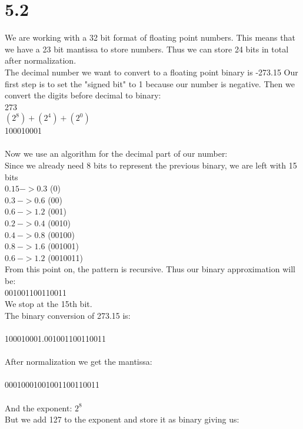 \documentclass{article}
\begin{document}
    \section{5.2}

    We are working with a 32 bit format of floating point numbers. This means that we have a 23 bit mantissa to store numbers.
    Thus we can store 24 bits in total after normalization.\\
    The decimal number we want to convert to a floating point binary is -273.15
    Our first step is to set the "signed bit" to 1 because our number is negative.
    Then we convert the digits before   decimal to binary:\\
    273\\
    $(2 ^ 8) + (2 ^ 4) + (2 ^ 0)$\\
    100010001\\
    \\
    Now we use an algorithm for the decimal part of our number:\\
    Since we already need 8 bits to represent the previous binary, we are left with 15 bits\\
    $0.15 -> 0.3$ (0)\\
    $0.3\  -> 0.6$ (00)\\
    $0.6\  -> 1.2$ (001)\\
    $0.2\ -> 0.4$ (0010)\\
    $0.4\  -> 0.8$ (00100)\\
    $0.8\  -> 1.6$ (001001)\\
    $0.6\  -> 1.2$ (0010011)\\
    From this point on, the pattern is recursive. Thus our binary approximation will be:\\
    001001100110011\\
    We stop at the 15th bit.\\
    The binary conversion of 273.15 is:\\
    \\
    100010001.001001100110011\\
    \\
    After normalization we get the mantissa:\\
    \\
    00010001001001100110011\\
    \\
    And the exponent: $2 ^ 8$\\
    But we add 127 to the exponent and store it as binary giving us:\\
\end{document}
